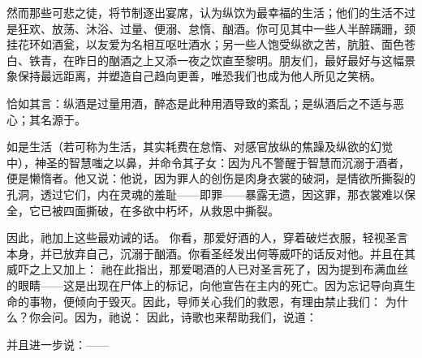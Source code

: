 然而那些可悲之徒，将节制逐出宴席，认为纵饮为最幸福的生活；他们的生活不过是狂欢、放荡、沐浴、过量、便溺、怠惰、酗酒。你可见其中一些人半醉蹒跚，颈挂花环如酒瓮，以友爱为名相互呕吐酒水；另一些人饱受纵欲之苦，肮脏、面色苍白、铁青，在昨日的酗酒之上又添一夜之饮直至黎明。朋友们，最好最好与这幅景象保持最远距离，并塑造自己趋向更善，唯恐我们也成为他人所见之笑柄。\par

恰如其言：纵酒是过量用酒，醉态是此种用酒导致的紊乱；是纵酒后之不适与恶心；其名源于。\par

如是生活（若可称为生活，其实耗费在怠惰、对感官放纵的焦躁及纵欲的幻觉中），神圣的智慧嗤之以鼻，并命令其子女：因为凡不警醒于智慧而沉溺于酒者，便是懒惰者。他又说：他说，因为罪人的创伤是肉身衣裳的破洞，是情欲所撕裂的孔洞，透过它们，内在灵魂的羞耻——即罪——暴露无遗，因这罪，那衣裳难以保全，它已被四面撕破，在多欲中朽坏，从救恩中撕裂。\par

因此，祂加上这些最劝诫的话。  你看，那爱好酒的人，穿着破烂衣服，轻视圣言本身，并已放弃自己，沉溺于酗酒。你看圣经发出何等威吓的话反对他。并且在其威吓之上又加上： 祂在此指出，那爱喝酒的人已对圣言死了，因为提到布满血丝的眼睛——这是出现在尸体上的标记，向他宣告在主内的死亡。因为忘记导向真生命的事物，便倾向于毁灭。因此，导师关心我们的救恩，有理由禁止我们： 为什么？你会问。因为，祂说： 因此，诗歌也来帮助我们，说道：\par

\par

并且进一步说：——\par

\par

